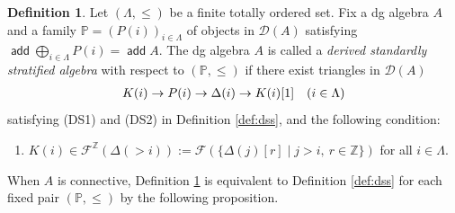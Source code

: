 \documentclass[a4paper,reqno,11pt]{amsart}
\numberwithin{equation}{section}
\theoremstyle{definition}
\newtheorem{definition}[theorem]{Definition}
\newcommand{\D}{\mathcal{D}}
\newcommand{\F}{\mathcal{F}}
\newcommand{\ZZ}{\mathbb{Z}}
\newcommand{\PP}{\mathbb{P}}
\newcommand{\bde}{\Delta}
\DeclareMathOperator{\add}{\mathsf{add}}
\begin{document}
\begin{definition}\label{def:gdss}
Let $(\Lambda,\leq)$ be a finite totally ordered set. Fix a dg algebra $A$ and a family $\PP=(P(i))_{i\in\Lambda}$ of objects in $\D(A)$ satisfying $\add\bigoplus_{i\in\Lambda}P(i)=\add A$.
The dg algebra $A$ is called a \emph{derived standardly stratified algebra} with respect to $(\PP,\leq)$ if there exist triangles in $\D(A)$
\begin{align}
K(i)\to P(i)\to \bde(i)\to K(i)[1]\quad(i\in\Lambda)\notag
\end{align}
satisfying (DS1) and (DS2) in Definition \ref{def:dss}, and the following condition:
\begin{enumerate}
\item[(DS3$'$)] $K(i)\in\F^{\ZZ}(\bde(>i)):=\F(\{\bde(j)[r]\mid j>i,\ r\in\ZZ\})$ for all $i\in\Lambda$.
\end{enumerate}
\end{definition}

When $A$ is connective, Definition \ref{def:gdss} is equivalent to Definition \ref{def:dss} for each fixed pair $(\PP,\leq)$ by the following proposition.
\end{document}
